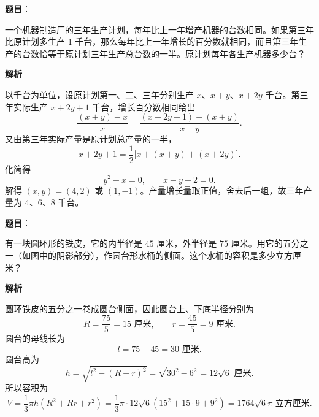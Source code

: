 \begin{answer}

\textbf{题目}：

一个机器制造厂的三年生产计划，每年比上一年增产机器的台数相同。如果第三年比原计划多生产 1 千台，那么每年比上一年增长的百分数就相同，而且第三年生产的台数恰等于原计划三年生产总台数的一半。原计划每年各生产机器多少台？

\textbf{解析}

以千台为单位，设原计划第一、二、三年分别生产 $x$、$x+y$、$x+2y$ 千台。第三年实际生产 $x+2y+1$ 千台，增长百分数相同给出
\nopagebreak[4]
\[
\frac{(x+y)-x}{x}
=\frac{(x+2y+1)-(x+y)}{x+y}.
\]
又由第三年实际产量是原计划总产量的一半，
\nopagebreak[4]
\[
x+2y+1=\frac12\bigl[x+(x+y)+(x+2y)\bigr].
\]
化简得
\nopagebreak[4]
\[
y^2-x=0,
\qquad x-y-2=0.
\]
解得 $(x,y)=(4,2)$ 或 $(1,-1)$。产量增长量取正值，舍去后一组，故三年产量为 $4$、$6$、$8$ 千台。


\end{answer}
\begin{answer}

\textbf{题目}：

有一块圆环形的铁皮，它的内半径是 $45$ 厘米，外半径是 $75$ 厘米。用它的五分之一（如图中的阴影部分），作圆台形水桶的侧面。这个水桶的容积是多少立方厘米？
\nopagebreak[4]
\begin{center}\end{center}
\nopagebreak[4]
\textbf{解析}

圆环铁皮的五分之一卷成圆台侧面，因此圆台上、下底半径分别为
\nopagebreak[4]
\[
R=\frac{75}{5}=15\text{ 厘米},
\qquad r=\frac{45}{5}=9\text{ 厘米}.
\]
圆台的母线长为
\nopagebreak[4]
\[
l=75-45=30\text{ 厘米}.
\]
圆台高为
\nopagebreak[4]
\[
h=\sqrt{l^2-(R-r)^2}
=\sqrt{30^2-6^2}=12\sqrt6\text{ 厘米}.
\]
所以容积为
\nopagebreak[4]
\[
V=\frac13\pi h(R^2+Rr+r^2)
=\frac13\pi\cdot12\sqrt6(15^2+15\cdot9+9^2)
=1764\sqrt6\pi\text{ 立方厘米}.
\]


\end{answer}
